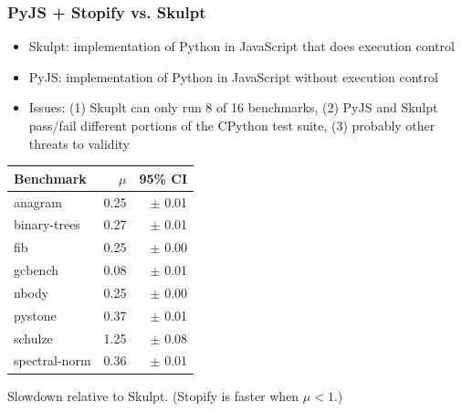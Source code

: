 \documentclass[8pt,pdf,handout]{beamer}
\begin{document}
\begin{frame}
\frametitle{PyJS + Stopify vs. Skulpt}

\begin{itemize}
  \item Skulpt: implementation of Python in JavaScript that does execution
  control
  \item PyJS: implementation of Python in JavaScript without execution
  control
  \pause
  \item Issues: (1) Skuplt can only run 8 of 16 benchmarks, (2) PyJS and Skulpt
  pass/fail different portions of the CPython test suite, (3) probably other
  threats to validity
\end{itemize}

\pause

\begin{center}
\begin{tabular}{|l|r|r|}
\hline
Benchmark & $\mu$ & 95\% CI \\
\hline
anagram & 0.25 & $\pm$ 0.01 \\
binary-trees & 0.27 & $\pm$ 0.01 \\
fib & 0.25 & $\pm$ 0.00 \\
gcbench & 0.08 & $\pm$ 0.01 \\
nbody & 0.25 & $\pm$ 0.00 \\
pystone & 0.37 & $\pm$ 0.01 \\
schulze & 1.25 & $\pm$ 0.08 \\
spectral-norm & 0.36 & $\pm$ 0.01 \\
\hline
\end{tabular}

Slowdown relative to Skulpt. (Stopify is faster when $\mu < 1$.)

\end{center}

\end{frame}
\end{document}
